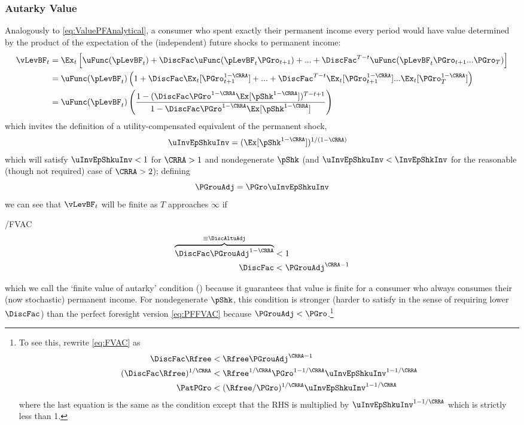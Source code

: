 \documentclass[BufferStockTheory]{subfiles}
\begin{document}
\subsubsection{Autarky Value}
Analogously to \eqref{eq:ValuePFAnalytical}, a consumer who spent exactly their permanent income every period would have value determined by the product of the expectation of the (independent) future shocks to permanent income:
\begin{align*}
  \vLevBF_{t}  & = \Ex_{t}\left[\uFunc(\pLevBF_{t}) + \DiscFac \uFunc(\pLevBF_{t}\PGro_{t+1}) + ... + \DiscFac^{T-t}\uFunc(\pLevBF_{t}\PGro_{t+1}...\PGro_{T})\right] \\
               & = \uFunc(\pLevBF_{t})\left(1+ \DiscFac \Ex_{t}[\PGro_{t+1}^{1-\CRRA}] +  ... + \DiscFac^{T-t}\Ex_{t}[\PGro_{t+1}^{1-\CRRA}]...\Ex_{t}[\PGro_{T}^{1-\CRRA}]\right) \\
               & = \uFunc(\pLevBF_{t})\left(\frac{1-(\DiscFac \PGro^{1-\CRRA}\Ex[\pShk^{1-\CRRA}])^{T-t+1}}{1-\DiscFac \PGro^{1-\CRRA} \Ex[\pShk^{1-\CRRA}]}\right)
\end{align*}
which invites the definition of a utility-compensated equivalent of the permanent shock,
\begin{align*}
  \uInvEpShkuInv  & = (\Ex[\pShk^{1-\CRRA}])^{1/(1-\CRRA)}
\end{align*}
which will satisfy $\uInvEpShkuInv < 1$ for $\CRRA>1$ and nondegenerate $\pShk$ (and $\uInvEpShkuInv < \InvEpShkInv$ for the reasonable (though not required) case of $\CRRA > 2$); defining
\begin{equation}
  \label{eq:PGrouAdj}
 \PGrouAdj = \PGro \uInvEpShkuInv 
\end{equation}
we can see that $\vLevBF_{t}$ will be finite as $T$ approaches $\infty$ if
\hypertarget{FVAC}{}
\begin{verbatimwrite}{\EqDir/FVAC}
  \begin{align}
    \overbrace{\DiscFac \PGrouAdj^{1-\CRRA} }^{\equiv \DiscAltuAdj}  & < 1 \label{eq:FVAC}
    \\ \DiscFac  & < \PGrouAdj^{\CRRA-1} \notag
  \end{align}
\end{verbatimwrite}
 which we call the `finite value of autarky'
condition (\FVAC) because it guarantees that value is finite for a consumer who always consumes their 
(now stochastic) permanent income.  For nondegenerate $\pShk$, this 
condition is stronger
(harder to satisfy in the sense of requiring lower $\DiscFac$) than
the perfect foresight version \eqref{eq:PFFVAC} because $\PGrouAdj <
\PGro$.\footnote{To see this, rewrite \eqref{eq:FVAC} as 
\begin{align*}
  \DiscFac \Rfree & < \Rfree \PGrouAdj^{\CRRA-1}
  \\ (\DiscFac \Rfree)^{1/\CRRA}  & < \Rfree^{1/\CRRA} \PGro^{1-1/\CRRA} \uInvEpShkuInv^{1-1/\CRRA}
  \\ \PatPGro & < (\Rfree/\PGro)^{1/\CRRA} \uInvEpShkuInv^{1-1/\CRRA}
\end{align*}
where the last equation is the same as the {\PFFVAC} condition except that the 
RHS is multiplied by $\uInvEpShkuInv^{1-1/\CRRA}$ which is strictly less than 1.}
\end{document}
